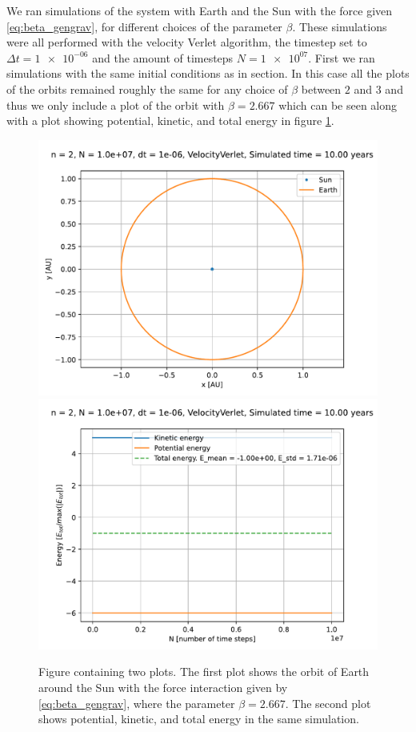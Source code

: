 \documentclass[reprint,english,notitlepage]{revtex4-1}  %
\begin{document}
We ran simulations of the system with Earth and the Sun with the force given \eqref{eq:beta_gengrav}, for different choices of the parameter $\beta$. These simulations were all performed with the velocity Verlet algorithm, the timestep set to $\Delta t = \num{1e-06}$ and the amount of timesteps $N = \num{1e+07}$. First we ran simulations with the same initial conditions as in section. In this case all the plots of the orbits remained roughly the same for any choice of $\beta$ between $2$ and $3$ and thus we only include a plot of the orbit with $\beta=2.667$ which can be seen along with a plot showing potential, kinetic, and total energy in figure \ref{fig:beta-se-orbit-energy}.


\begin{figure}[H]
\includegraphics[width=\columnwidth]{../data/figures/varyingbeta/se_beta2667_vv_orbits2D.pdf}
\includegraphics[width=\columnwidth]{../data/figures/varyingbeta/se_beta2667_vv_energy.pdf}
\caption{Figure containing two plots. The first plot shows the orbit of Earth around the Sun with the force interaction given by \eqref{eq:beta_gengrav}, where the parameter $\beta = 2.667$. The second plot shows potential, kinetic, and total energy in the same simulation.} 
\label{fig:beta-se-orbit-energy}
\end{figure}
\end{document}

